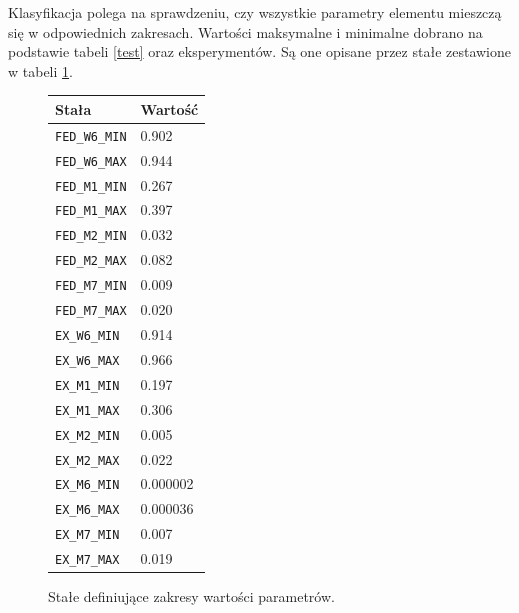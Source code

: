 \documentclass[12pt, oneside, final]{report}
\begin{document}
Klasyfikacja polega na sprawdzeniu, czy wszystkie parametry elementu mieszczą się w odpowiednich zakresach. Wartości maksymalne i minimalne dobrano na podstawie tabeli \ref{test} oraz eksperymentów. Są one opisane przez stałe zestawione w tabeli \ref{consts}.
\begin{figure}[ht!]
	\centering
	\begin{tabular}{|l|l|}
		\hline
		Stała & Wartość\\
		\hline
		\texttt{FED\_W6\_MIN} & 0.902\\
		\texttt{FED\_W6\_MAX} & 0.944\\
		\texttt{FED\_M1\_MIN} & 0.267\\
		\texttt{FED\_M1\_MAX} & 0.397\\
		\texttt{FED\_M2\_MIN} & 0.032\\
		\texttt{FED\_M2\_MAX} & 0.082\\
		\texttt{FED\_M7\_MIN} & 0.009\\
		\texttt{FED\_M7\_MAX} & 0.020\\
		\texttt{EX\_W6\_MIN} & 0.914\\
		\texttt{EX\_W6\_MAX} & 0.966\\
		\texttt{EX\_M1\_MIN} & 0.197\\
		\texttt{EX\_M1\_MAX} & 0.306\\
		\texttt{EX\_M2\_MIN} & 0.005\\
		\texttt{EX\_M2\_MAX} & 0.022\\
		\texttt{EX\_M6\_MIN} & 0.000002\\
		\texttt{EX\_M6\_MAX} & 0.000036\\
		\texttt{EX\_M7\_MIN} & 0.007\\
		\texttt{EX\_M7\_MAX} & 0.019\\
		\hline
	\end{tabular}
	\caption{Stałe definiujące zakresy wartości parametrów.}
	\label{consts}
\end{figure}
\end{document}
